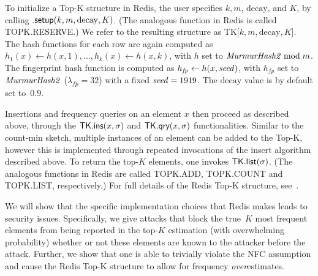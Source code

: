 To initialize a Top-K structure in Redis, the user specifies $k, m$, $\mathrm{decay}$, and $K$, by calling \rTK.$\textsf{setup}(k, m, \mathrm{decay}, K)$. (The analogous function in Redis is called \textsf{TOPK.RESERVE}.) We refer to the resulting structure as TK[$k, m, \mathrm{decay}, K$].
The hash functions for each row are again computed as $h_1(x) \gets h(x, 1), ..., h_k(x) \gets h(x, k)$, with $h$ set to $\mathit{MurmurHash2} \bmod m$. The fingerprint hash function is computed as $h_\mathit{fp} \gets h(x, \mathit{seed})$, with $h_\mathit{fp}$ set to $\mathit{MurmurHash2}$ ($\lambda_{\mathit{fp}} = 32$) with a fixed $\mathit{seed} = 1919$. The $\mathrm{decay}$ value is by default set to~$0.9$. 

Insertions and frequency queries on an element $x$ then proceed as described above, through the $\textsf{TK}.\textsf{ins}(x, \sigma)$ and $\textsf{TK}.\textsf{qry}(x, \sigma)$ functionalities. Similar to the count-min sketch, multiple instances of an element can be added to the Top-K, however this is implemented through repeated invocations of the insert algorithm described above. 
To return the top-$K$ elements, one invokes $\textsf{TK}.\textsf{list}(\sigma)$. (The analogous functions in Redis are called \textsf{TOPK.ADD}, \textsf{TOPK.COUNT} and \textsf{TOPK.LIST}, respectively.) For full details of the Redis Top-K structure, see~. 

We will show that the specific implementation choices that Redis makes leads to security issues. Specifically, we give attacks that block the true~$K$ most frequent elements from being reported in the top-$K$ estimation (with overwhelming probability) whether or not these elements are known to the attacker before the attack. Further, we show that one is able to trivially violate the NFC assumption and cause the Redis Top-K structure to allow for frequency \emph{over}estimates.